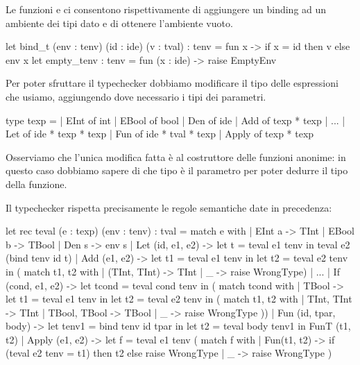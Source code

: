 Le funzioni  e  ci consentono rispettivamente di aggiungere un binding ad un ambiente dei tipi dato e di ottenere l'ambiente vuoto.
\begin{OCaml}
    let bind_t (env : tenv) (id : ide) (v : tval) : tenv =
        fun x -> if x = id then v else env x
    let empty_tenv : tenv = fun (x : ide) -> raise EmptyEnv
\end{OCaml}

Per poter sfruttare il typechecker dobbiamo modificare il tipo delle espressioni che usiamo, aggiungendo dove necessario i tipi dei parametri.
\begin{OCaml}
    type texp =
        | EInt of int
        | EBool of bool
        | Den of ide
        | Add of texp * texp
        | ...
        | Let of ide * texp * texp
        | Fun of ide * tval * texp
        | Apply of texp * texp
\end{OCaml}

Osserviamo che l'unica modifica fatta è al costruttore delle funzioni anonime: in questo caso dobbiamo sapere di che tipo è il parametro per poter dedurre il tipo della funzione.

Il typechecker rispetta precisamente le regole semantiche date in precedenza:
\begin{OCaml}
    let rec teval (e : texp) (env : tenv) : tval =
        match e with
        | EInt a -> TInt
        | EBool b -> TBool
        | Den s -> env s
        | Let (id, e1, e2) -> 
            let t = teval e1 tenv in
                teval e2 (bind tenv id t)
        | Add (e1, e2) ->
            let t1 = teval e1 tenv in
            let t2 = teval e2 tenv in
                ( match t1, t2 with
                    | (TInt, TInt) -> TInt
                    | _ -> raise WrongType)
        | ...
        | If (cond, e1, e2) ->
            let tcond = teval cond tenv in
                ( match tcond with 
                    | TBool -> 
                        let t1 = teval e1 tenv in
                        let t2 = teval e2 tenv in
                            ( match t1, t2 with
                                | TInt, TInt -> TInt
                                | TBool, TBool -> TBool
                                | _ -> raise WrongType ))
        | Fun (id, tpar, body) ->
            let tenv1 = bind tenv id tpar in
            let t2 = teval body tenv1 in
                FunT (t1, t2)
        | Apply (e1, e2) ->
            let f = teval e1 tenv
                ( match f with
                    | Fun(t1, t2) -> 
                        if (teval e2 tenv = t1) then t2
                        else raise WrongType
                    | _ -> raise WrongType )
\end{OCaml}


